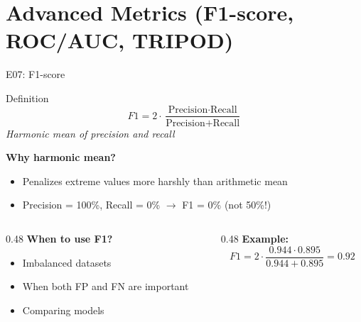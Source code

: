 \documentclass[aspectratio=169, 10pt]{beamer}
\begin{document}
\section{Advanced Metrics (F1-score, ROC/AUC, TRIPOD)}

\begin{frame}{E07: F1-score}
    
    \begin{block}{Definition}
        \[
        F1 = 2 \cdot \frac{\text{Precision} \cdot \text{Recall}}{\text{Precision} + \text{Recall}}
        \]
        \textit{Harmonic mean of precision and recall}
    \end{block}
    
    \vspace{3mm}
    
    \textbf{Why harmonic mean?}
    \begin{itemize}
        \item Penalizes extreme values more harshly than arithmetic mean
        \item Precision = 100\%, Recall = 0\% $\rightarrow$ F1 = 0\% (not 50\%!)
    \end{itemize}
    
    \vspace{3mm}
    
    \begin{columns}
        \begin{column}{0.48\textwidth}
            \textbf{When to use F1?}
            \begin{itemize}
                \item Imbalanced datasets
                \item When both FP and FN are important
                \item Comparing models
            \end{itemize}
        \end{column}
        
        \begin{column}{0.48\textwidth}
            \textbf{Example:}
            \[
            F1 = 2 \cdot \frac{0.944 \cdot 0.895}{0.944 + 0.895} = 0.92
            \]
        \end{column}
    \end{columns}
    
\end{frame}
\end{document}
